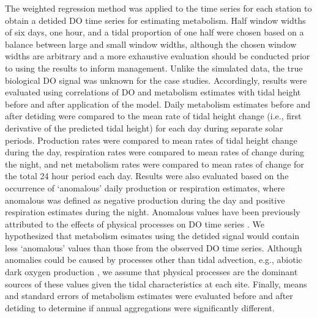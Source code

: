 \documentclass[letterpaper,12pt,oneside]{article}\usepackage[]{graphicx}\usepackage[]{color}
\begin{document}
The weighted regression method was applied to the time series for each station to obtain a detided \ac{DO} time series for estimating metabolism.  Half window widths of six days, one hour, and a tidal proportion of one half were chosen based on a balance between large and small window widths, although the chosen window widths are arbitrary and a more exhaustive evaluation should be conducted prior to using the results to inform management. Unlike the simulated data, the true biological \ac{DO} signal was unknown for the case studies.  Accordingly, results were evaluated  using correlations of \ac{DO} and metabolism estimates with tidal height before and after application of the model.  Daily metabolism estimates before and after detiding were compared to the mean rate of tidal height change (i.e., first derivative of the predicted tidal height) for each day during separate solar periods.  Production rates were compared to mean rates of tidal height change during the day, respiration rates were compared to mean rates of change during the night, and net metabolism rates were compared to mean rates of change for the total 24 hour period each day.  Results were also evaluated based on the occurrence of `anomalous' daily production or respiration estimates, where anomalous was defined as negative production during the day and positive respiration estimates during the night.  Anomalous values have been previously attributed to the effects of physical processes on \ac{DO} time series \citep{Caffrey03}.  We hypothesized that metabolism esimates using the detided signal would contain less `anomalous' values than those from the observed \ac{DO} time series.  Although anomalies could be caused by processes other than tidal advection, e.g., abiotic dark oxygen production \citep{Pamatmat97}, we assume that physical processes are the dominant sources of these values given the tidal characteristics at each site.  Finally, means and standard errors of metabolism estimates were evaluated before and after detiding to determine if annual aggregations were significantly different.   
\end{document}
